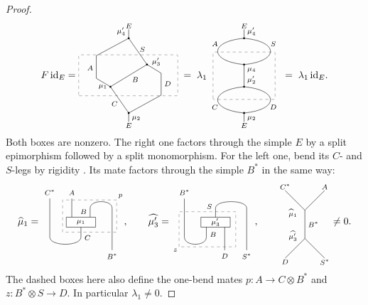 \documentclass{amsart}
\begin{document}
\begin{proof}
\[
 F\,\id_E=\caseone\;=\;\lambda_1\,\twobubbles\;=\;\lambda_1\,\id_E .
\]
Both boxes are nonzero. The right one factors through the simple $E$ by a split epimorphism followed by a split monomorphism. For the left one, bend its $C$- and $S$-legs by rigidity \cite[Proposition~2.10.8]{EGNO15}. Its mate factors through the simple $B^*$ in the same way:
\[
\widehat\mu_1=
\begin{tikzpicture}[baseline=(current bounding box.center),x=.65cm,y=.62cm,font=\scriptsize]
\draw[dashed,gray] (-.50,-.32) rectangle (2.45,1.52);
\node[anchor=south west,inner sep=1.5pt] at (2.45,1.52) {$p$};
\draw (-1.2,1.6) node[above] {$C^*$} --(-1.2,-.6)
 .. controls (-1.2,-1.15) and (.5,-1.15) .. (.5,-.6)--(.5,.05);
\draw (0,1.6) node[above] {$A$} --(0,.45);
\draw (1,.45)--(1,1.05)
 .. controls (1,1.55) and (2.2,1.55) .. (2.2,1.05)
 --(2.2,-1.35) node[below] {$B^*$};
\node[left,font=\scriptsize] at (1,.85) {$B$};
\node[right,font=\scriptsize] at (.5,-.64) {$C$};
\draw[fill=white] (-.3,-.035) rectangle (1.3,.535);
\node at (.5,.25) {$\mu_1$};
\end{tikzpicture},
\qquad
\widehat{\mu'_3}=
\begin{tikzpicture}[baseline=(current bounding box.center),x=.65cm,y=.62cm,font=\scriptsize]
\draw[dashed,gray] (-1.49,-1.16) rectangle (1.60,.85);
\node[anchor=north east,inner sep=1.5pt] at (-1.49,-1.16) {$z$};
\draw (-1.2,1.6) node[above] {$B^*$} --(-1.2,-.6)
 .. controls (-1.2,-1.15) and (0,-1.15) .. (0,-.6)--(0,.05);
\draw (.5,.45)--(.5,1.05)
 .. controls (.5,1.55) and (2.2,1.55) .. (2.2,1.05)
 --(2.2,-1.35) node[below] {$S^*$};
\draw (1,.05)--(1,-1.35) node[below] {$D$};
\node[left,font=\scriptsize] at (.5,1.15) {$S$};
\node[right,font=\scriptsize] at (0,-.45) {$B$};
\draw[fill=white] (-.3,-.035) rectangle (1.3,.535);
\node at (.5,.25) {$\mu'_3$};
\end{tikzpicture},
\qquad
\begin{tikzpicture}[baseline=(current bounding box.center),x=.78cm,y=.66cm,font=\scriptsize,inner sep=1pt]
\draw (-.9,1.82) node[above] {$C^*$} --(0,.76);
\draw (.9,1.82) node[above] {$A$} --(0,.76)--(0,-.76);
\draw (0,-.76)--(-.9,-1.82) node[below] {$D$};
\draw (0,-.76)--(.9,-1.82) node[below] {$S^*$};
\node[right=2pt] at (0,0) {$B^*$};
\node[anchor=east] at (-.29,.61) {$\widehat\mu_1$};
\node[anchor=east] at (-.29,-.61) {$\widehat{\mu'_3}$};
\end{tikzpicture}
\ne0.
\]
The dashed boxes here also define the one-bend mates $p:A\to C\otimes B^*$ and $z:B^*\otimes S\to D$. In particular $\lambda_1\ne0$.


\end{proof}
\end{document}
